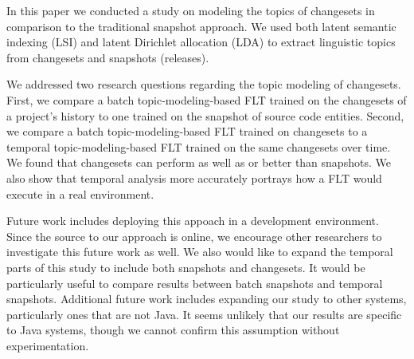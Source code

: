 
In this paper we conducted a study on modeling the topics of changesets in comparison to the traditional snapshot approach.
We used both latent semantic indexing (LSI) and latent Dirichlet
allocation (LDA) to extract linguistic topics from changesets and
snapshots (releases).

We addressed two research questions regarding the topic modeling of changesets.
First, we compare a batch topic-modeling-based FLT trained on the changesets
of a project's history to one trained on the snapshot of source code entities.
Second, we compare a batch topic-modeling-based FLT trained on changesets
to a temporal topic-modeling-based FLT trained on the same changesets over time.
We found that changesets can perform as well as or better than snapshots.
We also show that temporal analysis more accurately portrays how a FLT would execute in a real environment.


Future work includes deploying this appoach in a development environment.
Since the source to our approach is online, we encourage other researchers
to investigate this future work as well.
We also would like to expand the temporal parts of this study to include
both snapshots and changesets.
It would be particularly useful to compare results between batch snapshots and temporal snapshots.
Additional future work includes expanding our study to other systems,
particularly ones that are not Java.
It seems unlikely that our results are specific to Java systems,
though we cannot confirm this assumption without experimentation.


